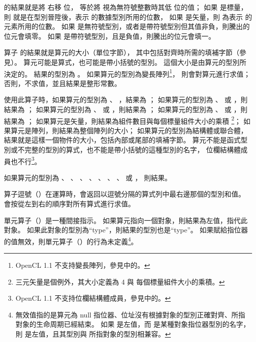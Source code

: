 { 的結果就是將  右移  位，
  等於將  視為無符號整數時其低  位的值；
如果  是標量，則  就是在型別晉陞後，表示  的數據型別所用的位數，
如果  是矢量，則  為表示  的元素所用的位數。
如果  是無符號型別，或者是帶符號型別但其值非負，則騰出的位元會填零。
如果  是帶符號型別，且是負值，則騰出的位元會填一。
\stopitem

\startitem
算子  的結果就是算元的大小（單位字節），
其中包括對齊時所需的填補字節（參見）。
算元可能是算式，也可能是帶小括號的型別。
這個大小是由算元的型別所決定的。
結果的型別為 。
如果算元的型別為變長陣列\footnote{OpenCL 1.1 不支持變長陣列，參見中的。}，
則會對算元進行求值；
否則，不求值，並且結果是整形常數。

使用此算子時，如果算元的型別為 、 ，結果為 ；
如果算元的型別為 、  或 ，則結果為 ；
如果算元的型別為 、  或 ，則結果為 ；
如果算元的型別為 、  或 ，則結果為 ；
如果算元是矢量，則結果為組件數目與每個標量組件大小的乘積
\footnote{三元矢量是個例外，其大小定義為 4 與 每個標量組件大小的乘積。}；
如果算元是陣列，則結果為整個陣列的大小；
如果算元的型別為結構體或聯合體，結果就是這樣一個物件的大小，包括內部或尾部的填補字節。
算元不能是函式型別或不完整的型別的算式，也不能是帶小括號的這種型別的名字，
位欄結構體成員也不行\footnote{OpenCL 1.1 不支持位欄結構體成員，參見中的。}。

如果算元的型別為 、 、 、
 、 、 、
 、  或 ，
則結果。
\stopitem

\startitem
算子逗號（\ccmm{,}）在運算時，會返回以逗號分隔的算式列中最右邊那個的型別和值。
會按從左到右的順序對所有算式進行求值。
\stopitem

\startitem
單元算子（\ccmm{*}）是一種間接指示。
如果算元指向一個對象，則結果為左值，指代此對象。
如果此對象的型別為“type”，則結果的型別也是“type”。
如果賦給指位器的值無效，則單元算子（\ccmm{*}）的行為未定義\footnote{
無效值指的是算元為 null 指位器、位址沒有根據對象的型別正確對齊、所指對象的生命周期已經結束。
如果  是左值，而  是某種對象指位器型別的名字，
則  是左值，且其型別與  所指對象的型別相兼容。
}。
\stopitem

}
